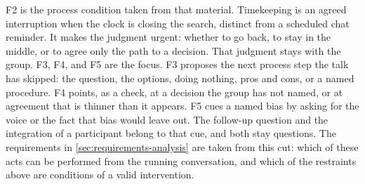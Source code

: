 F2 is the process condition taken from that material.
Timekeeping is an agreed interruption when the clock is closing the search, distinct from a
scheduled chat reminder.
It makes the judgment urgent: whether to go back, to stay in the middle, or to agree only
the path to a decision.
That judgment stays with the group.
F3, F4, and F5 are the focus.
F3 proposes the next process step the talk has skipped: the question, the options, doing
nothing, pros and cons, or a named procedure.
F4 points, as a check, at a decision the group has not named, or at agreement that is thinner
than it appears.
F5 cues a named bias by asking for the voice or the fact that bias would leave out.
The follow-up question and the integration of a participant belong to that cue, and both stay
questions.
The requirements in \autoref{sec:requirements-analysis} are taken from this cut: which of
these acts can be performed from the running conversation, and which of the restraints above
are conditions of a valid intervention.
